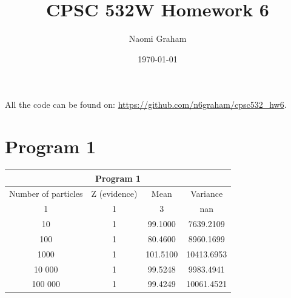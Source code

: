 \documentclass[12pt]{article}%
\theoremstyle{definition}
\begin{document}
	
	\title{CPSC 532W Homework 6}
	\author{Naomi Graham}
	\date{\today}
	\maketitle
	
	All the code can be found on: \url{https://github.com/n6graham/cpsc532_hw6}.
	


	
	
	
	
	
	
	\section{Program 1}
	
	\begin{center}
		 \begin{tabular}{||c || c c c ||} 
		 \hline
		\multicolumn{4}{|c|}{Program 1} \\
		 \hline
		 Number of particles & Z (evidence) & Mean & Variance \\ [0.5ex] 
		 \hline\hline
		 1 & 1 & 3 & nan  \\ 
		 \hline
		 10 & 1 & 99.1000 & 7639.2109  \\
		 \hline
		 100 & 1 & 80.4600 & 8960.1699  \\
		 \hline
		 1000 & 1 & 101.5100 & 10413.6953  \\  
		 \hline
		 10 000 & 1 & 99.5248 & 9983.4941  \\ [1ex]
		 \hline
		 100 000 & 1 & 99.4249 & 10061.4521  \\ [1ex]
		 \hline
		\end{tabular}
	\end{center}
	
\end{document}
